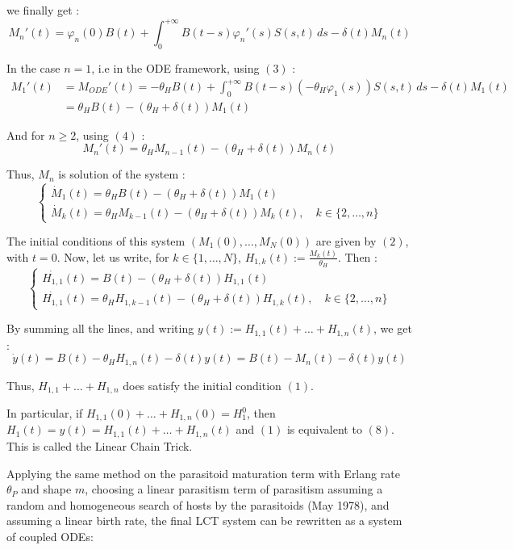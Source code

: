 \documentclass[12pt,a4paper,onecolumn]{article}
\begin{document}
we finally get :
\[
M_n'(t) = \varphi_n(0) B(t) + \int_0^{+\infty} B(t-s)\varphi_n'(s) S(s,t) \, ds - \delta(t) M_n(t)
\]

In the case $n = 1$, i.e in the ODE framework, using $(3)$ : 
\begin{align*}
M_{1}'(t) &= M_{ODE}'(t)= -\theta_H B(t) + \int_0^{+\infty} B(t-s)(-\theta_H \varphi_1(s)) S(s,t) \, ds - \delta(t) M_1(t) \\
&= \theta_H B(t) - (\theta_H + \delta(t)) M_1(t)
\end{align*}

And for $n \geq 2$, using $(4)$  :
\[
M_n'(t) = \theta_H M_{n-1}(t) - (\theta_H + \delta(t)) M_n(t)
\]

Thus, \(M_n\) is solution of the system :
\begin{equation}
\begin{cases}
\dot{M}_1(t) = \theta_H B(t) - (\theta_H + \delta(t)) M_1(t) \\
\dot{M}_k(t) = \theta_H M_{k-1}(t) - (\theta_H + \delta(t)) M_k(t), \quad k \in \{2, \dots, n\}
\end{cases}
\end{equation}

The initial conditions of this system  $(M_1(0), \dots, M_N(0))$ are given by $(2)$, with $t = 0$.
Now, let us write, for \(k \in \{1, \dots, N\}\), $H_{1,k}(t) := \frac{M_k(t)}{\theta_H}$. Then : 
\begin{equation}
\begin{cases}
\dot{H_{1,1}}(t) = B(t) - (\theta_H + \delta(t)) H_{1,1}(t) \\
\dot{H_{1,1}}(t) = \theta_H H_{1, k-1}(t) - (\theta_H + \delta(t)) H_{1,k}(t), \quad k \in \{2, \dots, n\}
\end{cases}
\end{equation}

By summing all the lines, and writing $y(t) := H_{1,1}(t) + \dots + H_{1,n}(t)$, we get :
\[
\dot{y}(t) = B(t) - \theta_H H_{1,n}(t) - \delta(t) y(t) = B(t) - M_n(t) - \delta(t) y(t)
\]

Thus, $H_{1,1} + \dots + H_{1,n}$ does satisfy the initial condition $(1)$.

In particular, if $H_{1,1}(0) + \dots + H_{1,n}(0) =  H_1^0$, then $H_1(t) = y(t) = H_{1,1}(t) + \dots + H_{1,n}(t)$ and $(1)$ is equivalent to $(8)$. This is called the Linear Chain Trick.

Applying the same method on the parasitoid maturation term with Erlang rate $\theta_P$ and shape $m$, choosing a linear parasitism term of parasitism assuming a random and homogeneous search of hosts by the parasitoids (May 1978), and assuming a linear birth rate, the final LCT system can be rewritten as a system of coupled ODEs:
\end{document}
